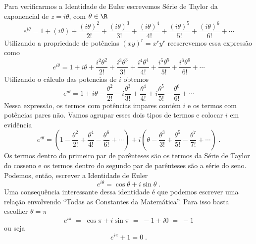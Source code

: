 Para verificarmos a Identidade de Euler escrevemos Série de Taylor
da exponencial de $z=i\theta$, com $\theta\in\R$
\[
e^{i\theta}
= 1 + (i\theta)
+ \frac{(i\theta)^2}{2!}
+ \frac{(i\theta)^3}{3!}
+ \frac{(i\theta)^4}{4!}
+ \frac{(i\theta)^5}{5!}
+ \frac{(i\theta)^6}{6!}
+ \cdots
\]
Utilizando a propriedade de potências $(xy)^r = x^r y^r$ reescrevemos essa expressão como
\[
e^{i\theta}
= 1 + i\theta
+ \frac{i^2\theta^2}{2!}
+ \frac{i^3\theta^3}{3!}
+ \frac{i^4\theta^4}{4!}
+ \frac{i^5\theta^5}{5!}
+ \frac{i^6\theta^6}{6!}
+ \cdots
\]
Utilizando o cálculo das potencias de $i$ obtemos
\[
e^{i\theta}
= 1
+ i\theta
-  \frac{\theta^2}{2!}
- i\frac{\theta^3}{3!}
+  \frac{\theta^4}{4!}
+ i\frac{\theta^5}{5!}
-  \frac{\theta^6}{6!}
+  \cdots
\]
Nessa expressão, os termos com potências impares contém $i$ e os termos
com potências pares não. Vamos agrupar esses dois tipos de termos
e colocar $i$ em evidência
\[
e^{i\theta}
= \left(
1
- \frac{\theta^2}{2!}
+ \frac{\theta^4}{4!}
- \frac{\theta^6}{6!}
+ \cdots
\right)
+ i \left(
\theta
- \frac{\theta^3}{3!}
+ \frac{\theta^5}{5!}
- \frac{\theta^7}{7!}
+ \cdots
\right)   \;.
\]
Os termos dentro do primeiro par de parênteses
são os termos da Série de Taylor do cosseno e os termos
dentro do segundo par de parênteses são a série do seno.
Podemos, então, escrever a Identidade de Euler
\[
e^{i\theta} = \cos\theta + i\sin\theta   \;.
\]
Uma consequência interessante dessa identidade é que podemos escrever
uma relação envolvendo ``Todas as Constantes da Matemática''.
Para isso basta escolher $\theta=\pi$
\[
e^{i\pi} \;=\; \cos\pi + i\sin\pi \;=\; -1 + i0 \;=\; -1
\]
ou seja
\[
e^{i\pi} + 1 = 0   \;.
\]

